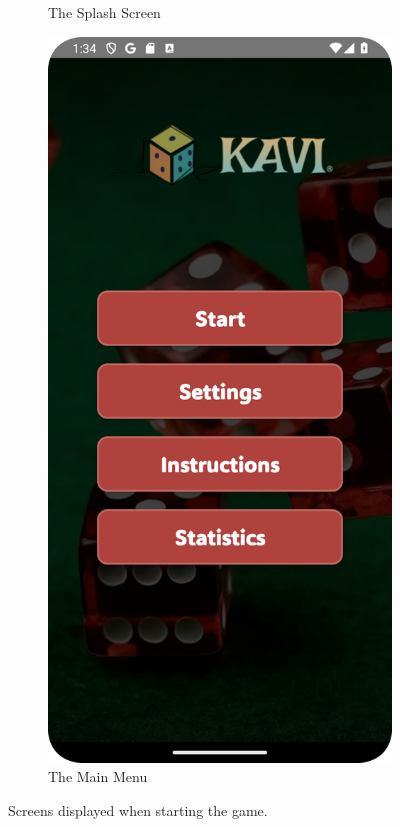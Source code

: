 \begin{figure}[h]
\begin{subfigure}[b]{0.27\textwidth}
        \caption{The Splash Screen}
        \label{fig:splash_screen}
    \end{subfigure}
    \hspace{1em}
    \begin{subfigure}[b]{0.27\textwidth}
        \centering
        \includegraphics[width=\textwidth]{img/main menu.png}
        \caption{The Main Menu}
        \label{fig:main_menu}
    \end{subfigure}
    \caption{Screens displayed when starting the game.}
    \label{fig:starting_game}
\end{figure}

